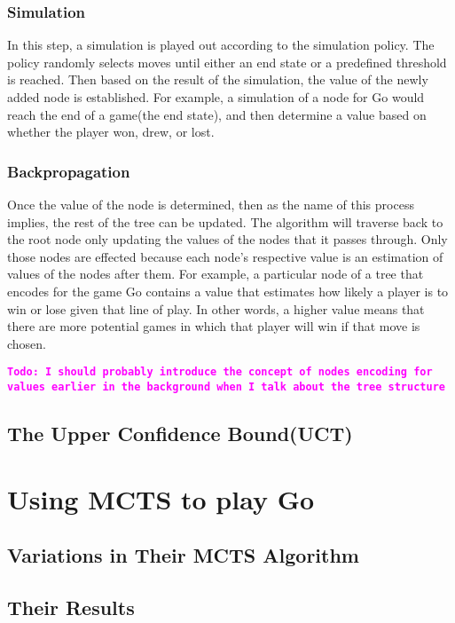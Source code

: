 \documentclass{sig-alternate}
\newcommand{\comment}[1]{{\bf \tt  {#1}}}
\newcommand{\todo}[1]{\textcolor{magenta}{\comment{Todo: {#1}}}}
\begin{document}
\subsubsection{Simulation}
In this step, a simulation is played out according to the simulation policy. The policy randomly selects moves until either an end state or a predefined threshold is reached. Then based on the result of the simulation, the value of the newly added node is established. For example, a simulation of a node for Go would reach the end of a game(the end state), and then determine a value based on whether the player won, drew, or lost.

\subsubsection{Backpropagation}
Once the value of the node is determined, then as the name of this process implies, the rest of the tree can be updated. The algorithm will traverse back to the root node only updating the values of the nodes that it passes through. Only those nodes are effected because each node's respective value is an estimation of values of the nodes after them. For example, a particular node of a tree that encodes for the game Go contains a value that estimates how likely a player is to win or lose given that line of play. In other words, a higher value means that there are more potential games in which that player will win if that move is chosen.

\todo{I should probably introduce the concept of nodes encoding for values earlier in the background when I talk about the tree structure}

\subsection{The Upper Confidence Bound(UCT)}

\section{Using MCTS to play Go}

\subsection{Variations in Their MCTS Algorithm}

\subsection{Their Results}
\end{document}
